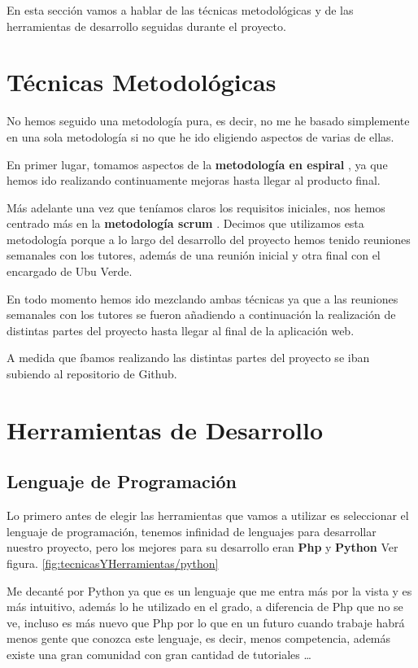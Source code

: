 En esta sección vamos a hablar de las técnicas metodológicas y de las herramientas de desarrollo seguidas durante el proyecto.

\section{Técnicas Metodológicas}
No hemos seguido una metodología pura, es decir, no me he basado simplemente en una sola metodología si no que he ido eligiendo aspectos de varias de ellas.

En primer lugar, tomamos aspectos de la \textbf{metodología en espiral} \cite{ModeloenEspiral}, ya que hemos ido realizando continuamente mejoras hasta llegar al producto final.

Más adelante una vez que teníamos claros los requisitos iniciales, nos hemos centrado más en la \textbf{metodología scrum} \cite{MetodologiaScrum}. Decimos que utilizamos esta metodología porque a lo largo del desarrollo del proyecto hemos tenido reuniones semanales con los tutores, además de una reunión inicial y otra final con el encargado de Ubu Verde.

En todo momento hemos ido mezclando ambas técnicas ya que a las reuniones semanales con los tutores se fueron añadiendo a continuación la realización de distintas partes del proyecto hasta llegar al final de la aplicación web.

A medida que íbamos realizando las distintas partes del proyecto se iban subiendo al repositorio de Github.

\section{Herramientas de Desarrollo}

\subsection{Lenguaje de Programación}
Lo primero antes de elegir las herramientas que vamos a utilizar es seleccionar el lenguaje de programación, tenemos infinidad de lenguajes para desarrollar nuestro proyecto, pero los mejores para su desarrollo eran \textbf{Php} \cite{Php} y \textbf{Python} \cite{Python} Ver figura. \ref{fig:tecnicasYHerramientas/python}


Me decanté por Python ya que es un lenguaje que me entra más por la vista y es más intuitivo, además lo he utilizado en el grado, a diferencia de Php que no se ve, incluso es más nuevo que Php por lo que en un futuro cuando trabaje habrá menos gente que conozca este lenguaje, es decir, menos competencia, además existe una gran comunidad con gran cantidad de tutoriales \ldots

